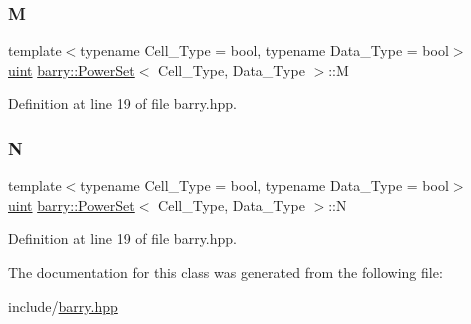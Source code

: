 \subsubsection{\texorpdfstring{M}{M}}
{\footnotesize\ttfamily template$<$typename Cell\+\_\+\+Type  = bool, typename Data\+\_\+\+Type  = bool$>$ \\
\hyperlink{namespacebarry_a11dfc53ddb4672278319aa04f1e09a6c}{uint} \hyperlink{classbarry_1_1_power_set}{barry\+::\+Power\+Set}$<$ Cell\+\_\+\+Type, Data\+\_\+\+Type $>$\+::M}



Definition at line 19 of file barry.\+hpp.

\mbox{\label{classbarry_1_1_power_set_aaa3bac8806b743aa84b18eb904b2f034}} 
\subsubsection{\texorpdfstring{N}{N}}
{\footnotesize\ttfamily template$<$typename Cell\+\_\+\+Type  = bool, typename Data\+\_\+\+Type  = bool$>$ \\
\hyperlink{namespacebarry_a11dfc53ddb4672278319aa04f1e09a6c}{uint} \hyperlink{classbarry_1_1_power_set}{barry\+::\+Power\+Set}$<$ Cell\+\_\+\+Type, Data\+\_\+\+Type $>$\+::N}



Definition at line 19 of file barry.\+hpp.



The documentation for this class was generated from the following file\+:\begin{DoxyCompactItemize}
\item 
include/\hyperlink{barry_8hpp}{barry.\+hpp}\end{DoxyCompactItemize}
